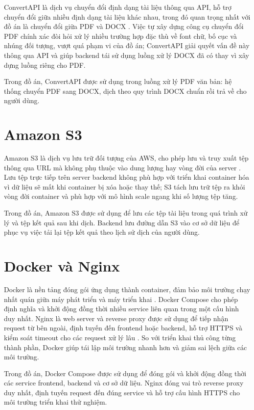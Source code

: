 \documentclass[../DoAn.tex]{subfiles}
\begin{document}
ConvertAPI là dịch vụ chuyển đổi định dạng tài liệu thông qua API, hỗ trợ chuyển đổi giữa nhiều định dạng tài liệu khác nhau, trong đó quan trọng nhất với đồ án là chuyển đổi giữa PDF và DOCX \cite{convertapi}. Việc tự xây dựng công cụ chuyển đổi PDF chính xác đòi hỏi xử lý nhiều trường hợp đặc thù về font chữ, bố cục và nhúng đối tượng, vượt quá phạm vi của đồ án; ConvertAPI giải quyết vấn đề này thông qua API và giúp backend tái sử dụng luồng xử lý DOCX đã có thay vì xây dựng luồng riêng cho PDF.

Trong đồ án, ConvertAPI được sử dụng trong luồng xử lý PDF văn bản: hệ thống chuyển PDF sang DOCX, dịch theo quy trình DOCX chuẩn rồi trả về cho người dùng.

\section{Amazon S3}
\label{section:3.8}

Amazon S3 là dịch vụ lưu trữ đối tượng của AWS, cho phép lưu và truy xuất tệp thông qua URL mà không phụ thuộc vào dung lượng hay vòng đời của server \cite{amazon-s3}. Lưu tệp trực tiếp trên server backend không phù hợp với triển khai container hóa vì dữ liệu sẽ mất khi container bị xóa hoặc thay thế; S3 tách lưu trữ tệp ra khỏi vòng đời container và phù hợp với mô hình scale ngang khi số lượng tệp tăng.

Trong đồ án, Amazon S3 được sử dụng để lưu các tệp tài liệu trong quá trình xử lý và tệp kết quả sau khi dịch. Backend lưu đường dẫn S3 vào cơ sở dữ liệu để phục vụ việc tải lại tệp kết quả theo lịch sử dịch của người dùng.

\section{Docker và Nginx}
\label{section:3.9}

Docker là nền tảng đóng gói ứng dụng thành container, đảm bảo môi trường chạy nhất quán giữa máy phát triển và máy triển khai \cite{docker}. Docker Compose cho phép định nghĩa và khởi động đồng thời nhiều service liên quan trong một cấu hình duy nhất. Nginx là web server và reverse proxy được sử dụng để tiếp nhận request từ bên ngoài, định tuyến đến frontend hoặc backend, hỗ trợ HTTPS và kiểm soát timeout cho các request xử lý lâu \cite{nginx}. So với triển khai thủ công từng thành phần, Docker giúp tái lập môi trường nhanh hơn và giảm sai lệch giữa các môi trường.

Trong đồ án, Docker Compose được sử dụng để đóng gói và khởi động đồng thời các service frontend, backend và cơ sở dữ liệu. Nginx đóng vai trò reverse proxy duy nhất, định tuyến request đến đúng service và hỗ trợ cấu hình HTTPS cho môi trường triển khai thử nghiệm.
\end{document}
